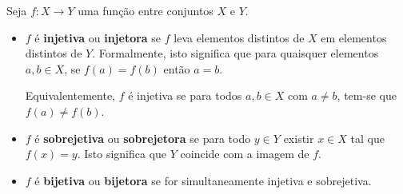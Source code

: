 \begin{definition}
	Seja $f\colon X\to Y$ uma função entre conjuntos $X$ e $Y$.
	\begin{itemize}
		\item $f$ é \textbf{injetiva} ou \textbf{injetora} se $f$ leva elementos distintos de $X$ em elementos distintos de $Y$. Formalmente, isto significa que para quaisquer elementos $a,b\in X$, se $f(a)=f(b)$ então $a=b$.
		
		Equivalentemente, $f$ é injetiva se para todos $a,b\in X$ com $a\neq b$, tem-se que $f(a)\neq f(b)$.
		
		\item $f$ é \textbf{sobrejetiva} ou \textbf{sobrejetora} se para todo $y\in Y$ existir $x\in X$ tal que $f(x)=y$. Isto significa que $Y$ coincide com a imagem de $f$.
		
		\item $f$ é \textbf{bijetiva} ou \textbf{bijetora} se for simultaneamente injetiva e sobrejetiva.
	\end{itemize}
\end{definition}